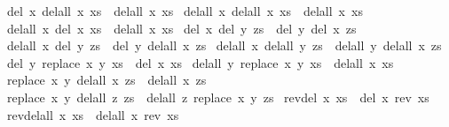\begin{isabellebody}
\begin{isamarkuptext}
\end{isamarkuptext}%
\isamarkuptrue%
\ {\isachardoublequote}del{}\ x\ {\isacharparenleft}delall\ x\ xs{\isacharparenright}\ {\isacharequal}\ delall\ x\ xs{\isachardoublequote}\isamarkupfalse%
\isanewline
\isamarkupfalse%
\ {\isachardoublequote}delall\ x\ {\isacharparenleft}delall\ x\ xs{\isacharparenright}\ {\isacharequal}\ delall\ x\ xs{\isachardoublequote}\isamarkupfalse%
\isanewline
\isamarkupfalse%
\ {\isachardoublequote}delall\ x\ {\isacharparenleft}del{}\ x\ xs{\isacharparenright}\ {\isacharequal}\ delall\ x\ xs{\isachardoublequote}\isamarkupfalse%
\isanewline
\isamarkupfalse%
\ {\isachardoublequote}del{}\ x\ {\isacharparenleft}del{}\ y\ zs{\isacharparenright}\ {\isacharequal}\ del{}\ y\ {\isacharparenleft}del{}\ x\ zs{\isacharparenright}{\isachardoublequote}\isamarkupfalse%
\isanewline
\isamarkupfalse%
\ {\isachardoublequote}delall\ x\ {\isacharparenleft}del{}\ y\ zs{\isacharparenright}\ {\isacharequal}\ del{}\ y\ {\isacharparenleft}delall\ x\ zs{\isacharparenright}{\isachardoublequote}\isamarkupfalse%
\isanewline
\isamarkupfalse%
\ {\isachardoublequote}delall\ x\ {\isacharparenleft}delall\ y\ zs{\isacharparenright}\ {\isacharequal}\ delall\ y\ {\isacharparenleft}delall\ x\ zs{\isacharparenright}{\isachardoublequote}\isamarkupfalse%
\isanewline
\isamarkupfalse%
\ {\isachardoublequote}del{}\ y\ {\isacharparenleft}replace\ x\ y\ xs{\isacharparenright}\ {\isacharequal}\ del{}\ x\ xs{\isachardoublequote}\isamarkupfalse%
\isanewline
\isamarkupfalse%
\ {\isachardoublequote}delall\ y\ {\isacharparenleft}replace\ x\ y\ xs{\isacharparenright}\ {\isacharequal}\ delall\ x\ xs{\isachardoublequote}\isamarkupfalse%
\isanewline
\isamarkupfalse%
\ {\isachardoublequote}replace\ x\ y\ {\isacharparenleft}delall\ x\ zs{\isacharparenright}\ {\isacharequal}\ delall\ x\ zs{\isachardoublequote}\isamarkupfalse%
\isanewline
\isamarkupfalse%
\ {\isachardoublequote}replace\ x\ y\ {\isacharparenleft}delall\ z\ zs{\isacharparenright}\ {\isacharequal}\ delall\ z\ {\isacharparenleft}replace\ x\ y\ zs{\isacharparenright}{\isachardoublequote}\isamarkupfalse%
\isanewline
\isamarkupfalse%
\ {\isachardoublequote}rev{\isacharparenleft}del{}\ x\ xs{\isacharparenright}\ {\isacharequal}\ del{}\ x\ {\isacharparenleft}rev\ xs{\isacharparenright}{\isachardoublequote}\isamarkupfalse%
\isanewline
\isamarkupfalse%
\ {\isachardoublequote}rev{\isacharparenleft}delall\ x\ xs{\isacharparenright}\ {\isacharequal}\ delall\ x\ {\isacharparenleft}rev\ xs{\isacharparenright}{\isachardoublequote}\isamarkupfalse%
\isamarkupfalse%
\isamarkupfalse%
\end{isabellebody}%
